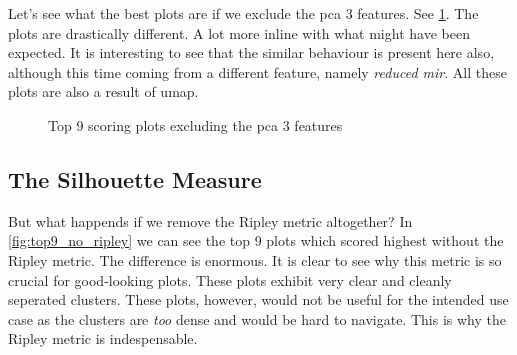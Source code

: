 \documentclass[11pt]{article}
\begin{document}
Let's see what the best plots are if we exclude the pca 3 features. See \ref{fig:top9_no_pca3}. The plots are drastically different. A lot more inline with what might have been expected. It is interesting to see that the similar behaviour is present here also, although this time coming from a different feature, namely \textit{reduced mir}. All these plots are also a result of umap.

\begin{figure}[htbp]
\centering
{}
\caption{Top 9 scoring plots excluding the pca 3 features}
\label{fig:top9_no_pca3}
\end{figure}

\subsection{The Silhouette Measure}

But what happends if we remove the Ripley metric altogether? In \ref{fig:top9_no_ripley} we can see the top 9 plots which scored highest without the Ripley metric. The difference is enormous. It is clear to see why this metric is so crucial for good-looking plots. These plots exhibit very clear and cleanly seperated clusters. These plots, however, would not be useful for the intended use case as the clusters are \textit{too} dense and would be hard to navigate. This is why the Ripley metric is indespensable.
\end{document}
